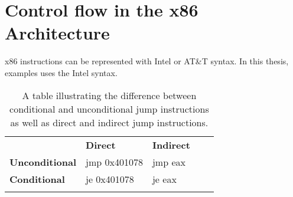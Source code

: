 \documentclass{kththesis}
\begin{document}
\section{Control flow in the x86 Architecture}

x86 instructions can be represented with Intel or AT\&T syntax. In this thesis, examples uses the Intel syntax.
\begin{table}[ht]
\centering
\begin{tabular}{lllll}
\cline{1-3}
\multicolumn{1}{|l|}{\textbf{}}              & \multicolumn{1}{l|}{\textbf{Direct}} & \multicolumn{1}{l|}{\textbf{Indirect}} &  &  \\ \cline{1-3}
\multicolumn{1}{|l|}{\textbf{Unconditional}} & \multicolumn{1}{l|}{jmp 0x401078}    & \multicolumn{1}{l|}{jmp eax}           &  &  \\ \cline{1-3}
\multicolumn{1}{|l|}{\textbf{Conditional}}   & \multicolumn{1}{l|}{je 0x401078}     & \multicolumn{1}{l|}{je eax}            &  &  \\ \cline{1-3}
                                             &                                      &                                        &  & 
\end{tabular}
\caption{A table illustrating the difference between conditional and unconditional jump instructions as well as direct and indirect jump instructions.}
\label{tab:jumps}
\end{table}
\end{document}
